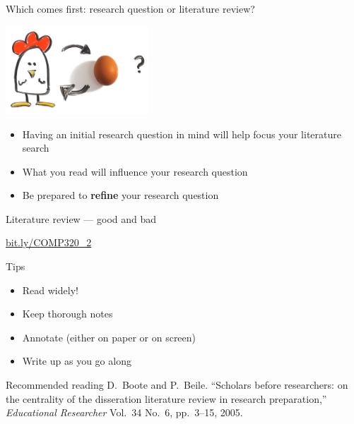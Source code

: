 \begin{frame}{Which comes first: research question or literature review?}
	\pause\begin{center}
		\includegraphics[width=0.4\textwidth]{chickenegg1}
	\end{center}
	\begin{itemize}
		\pause\item Having an initial research question in mind will help focus your literature search
		\pause\item What you read will influence your research question
		\pause\item Be prepared to \textbf{refine} your research question
	\end{itemize}
\end{frame}

\begin{frame}{Literature review --- good and bad}
	\begin{center}
		\url{bit.ly/COMP320_2}
	\end{center}
\end{frame}

\begin{frame}{Tips}
	\begin{itemize}
		\pause\item Read widely!
		\pause\item Keep thorough notes
		\pause\item Annotate (either on paper or on screen)
		\pause\item Write up as you go along
	\end{itemize}
\end{frame}

\begin{frame}{Recommended reading}
	D.\ Boote and P.\ Beile. ``Scholars before researchers: on the centrality of the disseration
		literature review in research preparation,'' \textit{Educational Researcher} Vol.\ 34 No.\ 6, pp.\ 3--15,
		2005.
\end{frame}
